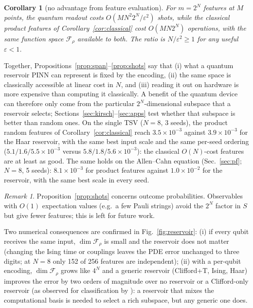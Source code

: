 \documentclass[11pt]{article}
\newtheorem{corollary}{Corollary}
\theoremstyle{remark}\newtheorem*{remark}{Remark}
\begin{document}
\begin{corollary}[no advantage from feature evaluation]\label{cor:cost}
For $m=2^N$ features at $M$ points, the quantum readout costs $O(MN^2 2^N/\varepsilon^2)$ shots, while the classical
product features of Corollary~\ref{cor:classical} cost $O(MN2^N)$ operations, with the same function space
$\mathcal F_\rho$ available to both. The ratio is $N/\varepsilon^2\ge1$ for any useful $\varepsilon<1$.
\end{corollary}

Together, Propositions~\ref{prop:span}--\ref{prop:shots} say that (i) what a quantum reservoir PINN can represent is fixed
by the encoding, (ii) the same space is classically accessible at linear cost in $N$, and (iii) reading it out on hardware
is more expensive than computing it classically. A benefit of the quantum device can therefore only come from the
particular $2^N$-dimensional subspace that a reservoir selects; Sections~\ref{sec:kirsch}--\ref{sec:apps} test whether that
subspace is better than random ones.
On the single TSV ($N=8$, 3 seeds), the product random features of Corollary~\ref{cor:classical} reach
$3.5\times10^{-3}$ against $3.9\times10^{-3}$ for the Haar reservoir, with the same best input scale and the same
per-seed ordering ($5.1/1.6/5.5\times10^{-3}$ versus $5.8/1.8/5.6\times10^{-3}$): the classical $O(N)$-cost
features are at least as good. The same holds on the Allen--Cahn equation (Sec.~\ref{sec:pf}; $N=8$, 5 seeds):
$8.1\times10^{-3}$ for product features against $1.0\times10^{-2}$ for the reservoir, with the same best scale in every seed.

\begin{remark}
Proposition~\ref{prop:shots} concerns outcome probabilities. Observables with $O(1)$ expectation values
(e.g.\ a few Pauli strings) avoid the $2^N$ factor in $S$ but give fewer features; this is left for future work.
\end{remark}

Two numerical consequences are confirmed in Fig.~\ref{fig:reservoir}:
(i) if every qubit receives the same input, $\dim\mathcal F_\rho$ is small and the reservoir does not matter
(changing the Ising time or couplings leaves the PDE error unchanged to three digits; at $N=8$ only 152 of 256
features are independent);
(ii) with a per-qubit encoding, $\dim\mathcal F_\rho$ grows like $4^N$ and a generic reservoir (Clifford+T, Ising, Haar)
improves the error by two orders of magnitude over no reservoir or a Clifford-only reservoir (as observed for
classification by \citet{ikeda2026qerc}): a reservoir that mixes the computational basis is needed to select a rich subspace,
but any generic one does.
\end{document}
